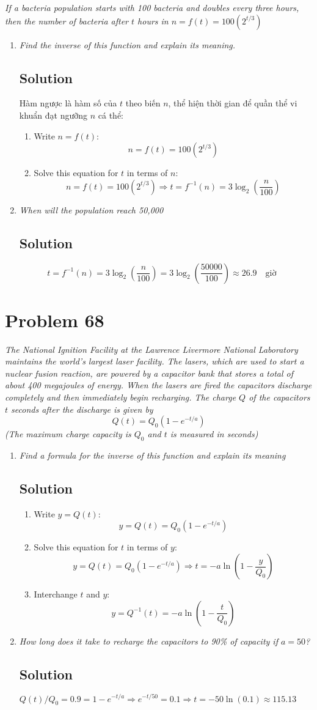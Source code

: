 \documentclass[11pt]{article}
\newcommand{\soln}{\subsection*}
\newcommand{\qn}{\textit}
\newcommand{\eqtext}[1]{\quad\text{#1}\quad}
\begin{document}
\qn{If a bacteria population starts with 100 bacteria and doubles every three hours, then the number of bacteria after $t$ hours in $n=f(t)=100(2^{t/3})$}
\begin{enumerate}
	\item \qn{Find the inverse of this function and explain its meaning.}
	\soln{Solution}
	Hàm ngược là hàm số của $t$ theo biến $n$, thể hiện thời gian để quần thể vi khuẩn đạt ngưỡng $n$ cá thể:
	\begin{enumerate}
		\item Write $n=f(t)$: $$n=f(t)=100(2^{t/3})$$
		\item Solve this equation for $t$ in terms of $n$: $$n=f(t)=100(2^{t/3}) \Rightarrow t=f^{-1}(n)=3\log_2(\frac{n}{100})$$
	\end{enumerate}
	
	\item \qn{When will the population reach 50,000}
	\soln{Solution}
	$$t=f^{-1}(n)=3\log_2(\frac{n}{100})=3\log_2(\frac{50000}{100})\approx26.9 \eqtext{giờ}$$
\end{enumerate}

\section*{Problem 68}

\qn{The National Ignition Facility at the Lawrence Livermore National Laboratory maintains the world's largest laser facility. The lasers, which are used to start a nuclear fusion reaction, are powered by a capacitor bank that stores a total of about 400 megajoules of energy. When the lasers are fired the capacitors discharge completely and then immediately begin recharging. The charge $Q$ of the capacitors $t$ seconds after the discharge is given by $$Q(t)=Q_0(1-e^{-t/a})$$ (The maximum charge capacity is $Q_0$ and $t$ is measured in seconds)}
\begin{enumerate}
	\item \qn{Find a formula for the inverse of this function and explain its meaning}
	\soln{Solution}
	\begin{enumerate}
		\item Write $y=Q(t)$: $$y=Q(t)=Q_0(1-e^{-t/a})$$
		\item Solve this equation for $t$ in terms of $y$: $$y=Q(t)=Q_0(1-e^{-t/a}) \Rightarrow t=-a\ln(1-\frac{y}{Q_0})$$
		\item Interchange $t$ and $y$: $$y=Q^{-1}(t)=-a\ln(1-\frac{t}{Q_0})$$
	\end{enumerate}
	
	\item \qn{How long does it take to recharge the capacitors to 90\% of capacity if $a=50$?}
	\soln{Solution}
	$Q(t)/Q_0=0.9=1-e^{-t/a} \Rightarrow e^{-t/50}=0.1 \Rightarrow t=-50\ln(0.1)\approx115.13$
\end{enumerate}
\end{document}
